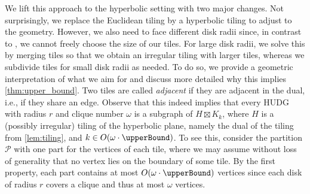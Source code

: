 \documentclass[11pt]{article}
\newtheorem{theorem}{Theorem}
\providecommand{\todo}[2][]{}
\newcommand{\calP}{\ensuremath{\mathcal{P}}\xspace}
\begin{document}
%
We lift this approach to the hyperbolic setting with two major changes.
Not surprisingly, we replace the Euclidean tiling by a hyperbolic tiling to adjust to the geometry.
However, we also need to face different disk radii since, in contrast to \cite{dvorak_notes_2021}, we cannot freely choose the size of our tiles.
For large disk radii, we solve this by merging tiles so that we obtain an irregular tiling with larger tiles, whereas we subdivide tiles for small disk radii as needed.
%
To do so, we provide a geometric interpretation of what we aim for and discuss more detailed why this implies \cref{thm:upper_bound}.
Two tiles are called \emph{adjacent} if they are adjacent in the dual, i.e., if they share an edge.
%
%
\tiling*
%
Observe that this indeed implies that every HUDG with radius $ r $ and clique number $ \omega $ is a subgraph of $ H \boxtimes K_k $, where $ H $ is a (possibly irregular) tiling of the hyperbolic plane, namely the dual of the tiling from \cref{lem:tiling}, and $ k \in O(\omega \cdot \upperBound) $.
To see this, consider the partition \calP with one part for the vertices of each tile, where we may assume without loss of generality that no vertex lies on the boundary of some tile.
By the first property, each part contains at most $ O(\omega \cdot \upperBound) $ vertices since each disk of radius $ r $ covers a clique and thus at most $ \omega $ vertices.
\end{document}
